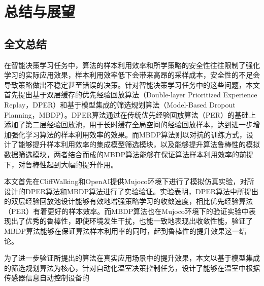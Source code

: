 
\chapter{总结与展望}

\section{全文总结}

在智能决策学习任务中，算法的样本利用效率和所学策略的安全性往往限制了强化学习的实际应用效果，样本利用效率低下会带来高昂的采样成本，安全性的不足会导致策略做出不稳定甚至错误的决策。针对智能决策学习任务中的这些问题，本文首先提出基于双层缓存的优先经验回放算法（Double-layer Prioritized Experience Replay，DPER）和基于模型集成的筛选规划算法（Model-Based Dropout Planning，MBDP）。DPER算法通过在传统优先经验回放算法（PER）的基础上添加了第二层经验回放池，用于长时缓存全局空间的经验回放样本，达到进一步增加强化学习算法的样本利用效率的效果。而MBDP算法则以对抗的训练方式，设计了能够提升样本利用效率的集成模型筛选模块，以及能够提升算法鲁棒性的模拟数据筛选模块，两者结合而成的MBDP算法能够在保证算法样本利用效率的前提下，对鲁棒性起到大幅的提升作用。

本文首先在CliffWalking和OpenAI提供Mujoco环境下进行了模拟仿真实验，对所设计的DPER算法和MBDP算法进行了实验验证。实验表明，DPER算法中所提出的双层经验回放池设计能够有效地增强策略学习的收敛速度，相比优先经验算法（PER）有着更好的样本效率。而MBDP算法也在Mujoco环境下的验证实验中表现出了优秀的鲁棒性，即使环境发生干扰，也能一致地表现出收敛性能，验证了MBDP算法能够在保证算法样本利用率的同时，起到鲁棒性的提升效果这一结论。

为了进一步验证所提出的算法在真实应用场景中的提升效果，本文以基于模型集成的筛选规划算法为核心，针对自动化温室决策控制任务，设计了能够在温室中根据传感器信息自动控制设备的